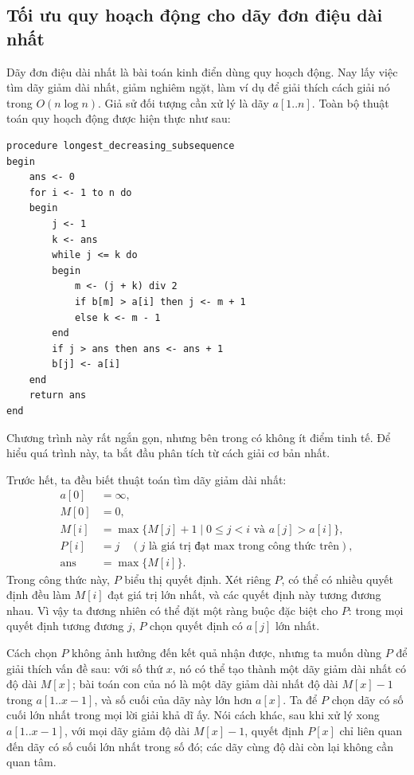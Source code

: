 \documentclass[11pt]{article}
\begin{document}
\subsection{Tối ưu quy hoạch động cho dãy đơn điệu dài nhất}

Dãy đơn điệu dài nhất là bài toán kinh điển dùng quy hoạch động. Nay lấy việc
tìm dãy giảm dài nhất, giảm nghiêm ngặt, làm ví dụ để giải thích cách giải nó
trong \(O(n\log n)\). Giả sử đối tượng cần xử lý là dãy \(a[1..n]\). Toàn bộ
thuật toán quy hoạch động được hiện thực như sau:

\begin{verbatim}
procedure longest_decreasing_subsequence
begin
    ans <- 0
    for i <- 1 to n do
    begin
        j <- 1
        k <- ans
        while j <= k do
        begin
            m <- (j + k) div 2
            if b[m] > a[i] then j <- m + 1
            else k <- m - 1
        end
        if j > ans then ans <- ans + 1
        b[j] <- a[i]
    end
    return ans
end
\end{verbatim}

Chương trình này rất ngắn gọn, nhưng bên trong có không ít điểm tinh tế. Để
hiểu quá trình này, ta bắt đầu phân tích từ cách giải cơ bản nhất.

Trước hết, ta đều biết thuật toán tìm dãy giảm dài nhất:
\[
\begin{aligned}
a[0]&=\infty,\\
M[0]&=0,\\
M[i]&=\max\{M[j]+1\mid 0\le j<i\text{ và }a[j]>a[i]\},\\
P[i]&=j\quad (j\text{ là giá trị đạt max trong công thức trên}),\\
\mathrm{ans}&=\max\{M[i]\}.
\end{aligned}
\]
Trong công thức này, \(P\) biểu thị quyết định. Xét riêng \(P\), có thể có
nhiều quyết định đều làm \(M[i]\) đạt giá trị lớn nhất, và các quyết định này
tương đương nhau. Vì vậy ta đương nhiên có thể đặt một ràng buộc đặc biệt cho
\(P\): trong mọi quyết định tương đương \(j\), \(P\) chọn quyết định có
\(a[j]\) lớn nhất.

Cách chọn \(P\) không ảnh hưởng đến kết quả nhận được, nhưng ta muốn dùng
\(P\) để giải thích vấn đề sau: với số thứ \(x\), nó có thể tạo thành một dãy
giảm dài nhất có độ dài \(M[x]\); bài toán con của nó là một dãy giảm dài nhất
độ dài \(M[x]-1\) trong \(a[1..x-1]\), và số cuối của dãy này lớn hơn
\(a[x]\). Ta để \(P\) chọn dãy có số cuối lớn nhất trong mọi lời giải khả dĩ
ấy. Nói cách khác, sau khi xử lý xong \(a[1..x-1]\), với mọi dãy giảm độ dài
\(M[x]-1\), quyết định \(P[x]\) chỉ liên quan đến dãy có số cuối lớn nhất
trong số đó; các dãy cùng độ dài còn lại không cần quan tâm.
\end{document}
